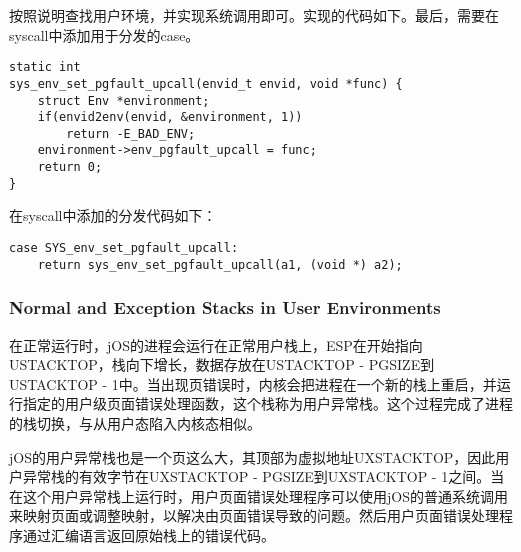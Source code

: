 \begin{exerciseSolution}{8}
    \par 按照说明查找用户环境，并实现系统调用即可。实现的代码如下。最后，需要在syscall中添加用于分发的case。
    \begin{lstlisting}
static int
sys_env_set_pgfault_upcall(envid_t envid, void *func) {
    struct Env *environment;
    if(envid2env(envid, &environment, 1))
        return -E_BAD_ENV;
    environment->env_pgfault_upcall = func;
    return 0;
}
    \end{lstlisting}
    \par 在syscall中添加的分发代码如下：
    \begin{lstlisting}
case SYS_env_set_pgfault_upcall:
    return sys_env_set_pgfault_upcall(a1, (void *) a2);
    \end{lstlisting}
\end{exerciseSolution}

\subsubsection{Normal and Exception Stacks in User Environments}
\par 在正常运行时，jOS的进程会运行在正常用户栈上，ESP在开始指向USTACKTOP，栈向下增长，数据存放在USTACKTOP - PGSIZE到USTACKTOP - 1中。当出现页错误时，内核会把进程在一个新的栈上重启，并运行指定的用户级页面错误处理函数，这个栈称为用户异常栈。这个过程完成了进程的栈切换，与从用户态陷入内核态相似。
\par jOS的用户异常栈也是一个页这么大，其顶部为虚拟地址UXSTACKTOP，因此用户异常栈的有效字节在UXSTACKTOP - PGSIZE到UXSTACKTOP - 1之间。当在这个用户异常栈上运行时，用户页面错误处理程序可以使用jOS的普通系统调用来映射页面或调整映射，以解决由页面错误导致的问题。然后用户页面错误处理程序通过汇编语言返回原始栈上的错误代码。

